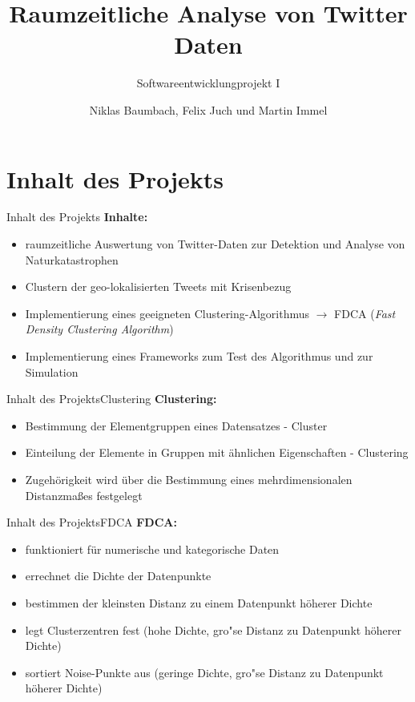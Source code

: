 \documentclass[12pt, xcolor={usenames,dvipsnames,svgnames,x11names,table}]{beamer}
\title{Raumzeitliche Analyse von Twitter Daten}
\subtitle{Softwareentwicklungprojekt I}
\author{Niklas Baumbach, Felix Juch und Martin Immel}
\date{}
\begin{document}
	\begin{frame}
	 	\titlepage
	\end{frame}	
	
	
	\section{Inhalt des Projekts}
	\begin{frame}{Inhalt des Projekts}{}
		\textbf{Inhalte:}\\
		\begin{itemize}
			\item raumzeitliche Auswertung von Twitter-Daten zur Detektion und Analyse von Naturkatastrophen
			\item Clustern der geo-lokalisierten Tweets mit Krisenbezug
			\item Implementierung eines geeigneten Clustering-Algorithmus $\rightarrow$ FDCA (\textit{Fast Density Clustering Algorithm})
			\item Implementierung eines Frameworks zum Test des Algorithmus und zur Simulation
		\end{itemize}
	\end{frame}
	
	\begin{frame}{Inhalt des Projekts}{Clustering}
		\textbf{Clustering:}
		\begin{itemize}
			\item Bestimmung der Elementgruppen eines Datensatzes - Cluster
			\item Einteilung der Elemente in Gruppen mit ähnlichen Eigenschaften - Clustering
			\item Zugehörigkeit wird über die Bestimmung eines mehrdimensionalen Distanzma\ss es festgelegt
		\end{itemize}\bigskip
	\end{frame}
	
	\begin{frame}{Inhalt des Projekts}{FDCA}
		\textbf{FDCA:}
		
		\begin{itemize}
			\item funktioniert für numerische und kategorische Daten
			\item errechnet die Dichte der Datenpunkte
			\item bestimmen der kleinsten Distanz zu einem Datenpunkt höherer Dichte
			\item legt Clusterzentren fest (hohe Dichte, gro"se Distanz zu Datenpunkt höherer Dichte)
			\item sortiert Noise-Punkte aus (geringe Dichte, gro"se Distanz zu Datenpunkt höherer Dichte)
		\end{itemize}
	\end{frame}
	
\end{document}
